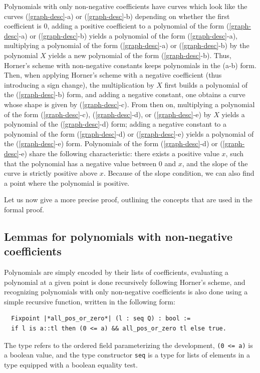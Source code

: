 \documentclass{mscs}
\begin{document}
Polynomials with only non-negative coefficients have curves which look
like the curves (\ref{graph-desc}-a) or (\ref{graph-desc}-b) depending on whether the first
coefficient is 0, adding a positive coefficient to a polynomial of the
form (\ref{graph-desc}-a) or (\ref{graph-desc}-b) yields a polynomial of the form (\ref{graph-desc}-a), multiplying a
polynomial of the form (\ref{graph-desc}-a) or (\ref{graph-desc}-b) by the polynomial \(X\) yields a new
polynomial of the form (\ref{graph-desc}-b).  Thus, Horner's scheme with non-negative
constants keeps polynomials in the (a-b) form.  Then, when applying
Horner's scheme with a negative coefficient (thus introducing a sign
change), the multiplication by \(X\) first builds a polynomial of the
(\ref{graph-desc}-b) form, and adding a negative constant, one obtains a curve whose
shape is given by (\ref{graph-desc}-c).  From then on, multiplying a polynomial of the
form (\ref{graph-desc}-c), (\ref{graph-desc}-d), or (\ref{graph-desc}-e) by \(X\) yields a polynomial of the (\ref{graph-desc}-d) form; adding a
negative constant to a polynomial of the form (\ref{graph-desc}-d) or (\ref{graph-desc}-e) yields a
polynomial of the (\ref{graph-desc}-e) form.  Polynomials of the form (\ref{graph-desc}-d) or (\ref{graph-desc}-e)
share the following characteristic: there exists a positive value
\(x\), such that the polynomial has a negative value between 0 and
\(x\), and the slope of the curve is strictly positive above
\(x\).  Because of the slope condition, we can also find a point where
the polynomial is positive.

Let us now give a more precise proof, outlining the concepts that are
used in the formal proof.

\subsection{Lemmas for polynomials with non-negative coefficients}
Polynomials are simply encoded by their lists of coefficients, evaluating
a polynomial at a given point is done recursively following Horner's scheme,
and recognizing polynomials with only non-negative coefficients is also
done using a simple recursive function, written in the following form:
\begin{lstlisting}
  Fixpoint |*all_pos_or_zero*| (l : seq Q) : bool :=
  if l is a::tl then (0 <= a) && all_pos_or_zero tl else true.
\end{lstlisting}
The type  refers to the ordered field
parameterizing the development, {\tt (0 <= a)} is
a boolean value, and the type constructor
{\tt seq} is a type for lists of elements in a type equipped with a
boolean equality test.
\end{document}
